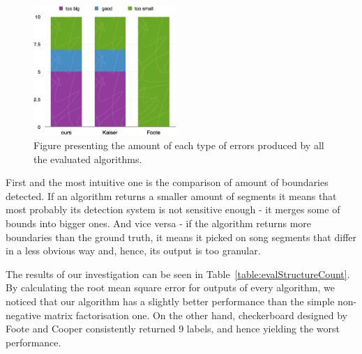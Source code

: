 \begin{figure}
\vspace{-10pt}
  \begin{center}
    \includegraphics[width=0.48\textwidth]{Figures/count}
  \end{center}
  \caption{Figure presenting the amount of each type of errors produced by all the evaluated algorithms.}
\label{fig:boundcount}
\end{figure}


First and the most intuitive one is the comparison of amount of boundaries detected. If an algorithm returns a smaller amount of segments it means that most probably its detection system is not sensitive enough - it merges some of bounds into bigger ones. And vice versa - if the algorithm returns more boundaries than the ground truth, it means it picked on song segments that differ in a less obvious way and, hence, its output is too granular.

The results of our investigation can be seen in Table~\ref{table:evalStructureCount}. By calculating the root mean square error for outputs of every algorithm, we noticed that our algorithm has a slightly better performance than the simple non-negative matrix factorisation one. On the other hand, checkerboard designed by Foote and Cooper consistently returned 9 labels, and hence yielding the worst performance.


